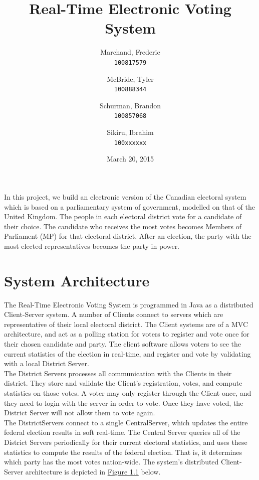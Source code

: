 \documentclass[11pt,english]{article}
\begin{document}
\title{\bf Real-Time Electronic Voting System}

\author{
    Marchand, Frederic \\
    \texttt{100817579}
    \and
    McBride, Tyler \\
    \texttt{100888344}
    \and
    Schurman, Brandon \\
    \texttt{100857068}
    \and
    Sikiru, Ibrahim \\
    \texttt{100xxxxxx}
}

\date{March 20, 2015}

\maketitle

In this project, we build an electronic version of the Canadian electoral system which is based
on a parliamentary system of government, modelled on that of the United Kingdom. The
people
in each electoral district vote for a candidate of their choice. The candidate who
receives the
most votes becomes Members of Parliament (MP) for that electoral district. After an election, the party with the most elected
representatives
becomes the party in power.


\section{System Architecture}

The Real-Time Electronic Voting System is programmed in Java as a distributed Client-Server
system. A number of Clients connect to servers which are representative of their local
electoral district. The Client systems are of a MVC architecture, and act as a polling
station for voters to register and vote once for their chosen candidate and party. The
client software allows voters to see the current statistics of the election in
real-time, and register and vote by validating with a local District Server. 
\vspace{2mm} \\
The District Servers processes all communication with the Clients in their district. They
store and validate the Client's registration, votes, and compute statistics on those
votes. A voter may only register through the Client once, and they need to login with the
server in order to vote. Once they have voted, the District Server will not allow
them to vote again.
\vspace{2mm} \\
The DistrictServers connect to a single CentralServer, which updates the entire federal election
results in soft real-time. The Central Server queries all of the District Servers
periodically for their current electoral statistics, and uses these statistics to compute
the results of the federal election. That is, it determines which party has the most votes
nation-wide. The system's distributed Client-Server architecture is depicted in
\underline{Figure 1.1} below. \\
\end{document}
